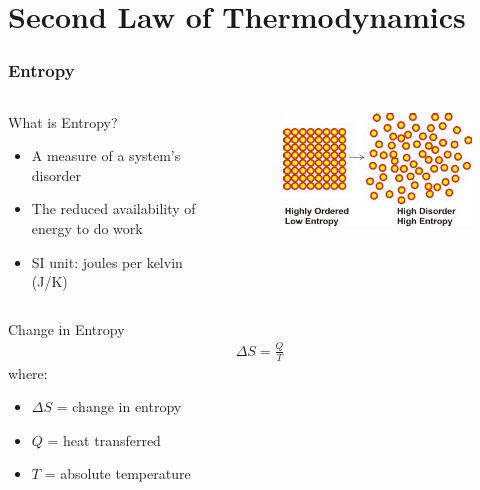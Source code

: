 \documentclass{beamer}
\begin{document}
\section{Second Law of Thermodynamics}

\begin{frame}
    \frametitle{Entropy}
    \begin{columns}
        \begin{block}{What is Entropy?}
            \begin{itemize}
                \item A measure of a system's disorder
                \item The reduced availability of energy to do work
                \item SI unit: joules per kelvin (J/K)
            \end{itemize}
        \end{block}
        
        \begin{center}
            \begin{figure}
                \centering
                \includegraphics[width=0.8\linewidth]{th-4090181554.jpg}
            \end{figure}
        \end{center}
    \end{columns}
    
    \begin{exampleblock}{Change in Entropy}
        \begin{align*}
            \Delta S = \frac{Q}{T}
        \end{align*}
        where:
        \begin{itemize}
            \item $\Delta S$ = change in entropy
            \item $Q$ = heat transferred
            \item $T$ = absolute temperature
        \end{itemize}
    \end{exampleblock}
\end{frame}
\end{document}
